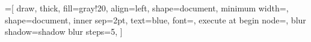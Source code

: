 \documentclass[14pt]{book}
\begin{document}
\fontsize{13pt}{17pt}\selectfont



\tableofcontents

\newpage
\listoffigures

=[%
draw,
thick,
fill=gray!20,
align=left,
shape=document,
minimum width=,
shape=document,
inner sep=2pt,
text=blue,
font=\large,
execute at begin node=\setlength{\baselineskip}{19pt},
blur shadow={shadow blur steps=5},
]


%
%
%
%

%
%
%
%
%
%
%
%
\end{document}
